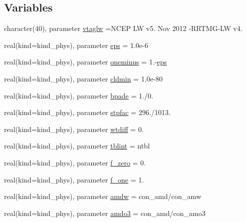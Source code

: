 \subsection*{Variables}
\begin{DoxyCompactItemize}
\item 
character(40), parameter \hyperlink{namespacemodule__radlw__main_a8d63a28d2550f8e193619e46a4c47d70}{vtaglw} =\textquotesingle{}N\+C\+EP LW v5. Nov 2012 -\/R\+R\+T\+MG-\/LW v4. \textquotesingle{}
\item 
real(kind=kind\+\_\+phys), parameter \hyperlink{group__module__radlw__main_gac82309fd8d0e351ac37b276833a10376}{eps} = 1.\+0e-\/6
\item 
real(kind=kind\+\_\+phys), parameter \hyperlink{group__module__radlw__main_ga8c35a92c2a08663ce04bdf9de8717247}{oneminus} = 1.-\/\hyperlink{group__module__radlw__main_gac82309fd8d0e351ac37b276833a10376}{eps}
\item 
real(kind=kind\+\_\+phys), parameter \hyperlink{group__module__radlw__main_gac55ad4a1ff397794e054be6647bafb73}{cldmin} = 1.\+0e-\/80
\item 
real(kind=kind\+\_\+phys), parameter \hyperlink{group__module__radlw__main_ga5c63b9836ad5735dd3d0811ff527c41c}{bpade} = 1./0.
\item 
real(kind=kind\+\_\+phys), parameter \hyperlink{group__module__radlw__main_ga483b88df2bdada7ef349d9530f91b762}{stpfac} = 296./1013.
\item 
real(kind=kind\+\_\+phys), parameter \hyperlink{group__module__radlw__main_gaf1a0ca36bfce779493a7d1a4b81f6f73}{wtdiff} = 0.
\item 
real(kind=kind\+\_\+phys), parameter \hyperlink{group__module__radlw__main_gaf6b84954042db7b1e2a6abdb4d401ccf}{tblint} = ntbl
\item 
real(kind=kind\+\_\+phys), parameter \hyperlink{group__module__radlw__main_ga9b8f65236249b31c8f9fcf1cfd0e7baa}{f\+\_\+zero} = 0.
\item 
real(kind=kind\+\_\+phys), parameter \hyperlink{group__module__radlw__main_ga518605a1451822f1888c6c7e85e07328}{f\+\_\+one} = 1.
\item 
real(kind=kind\+\_\+phys), parameter \hyperlink{group__module__radlw__main_ga9845c3a6eaa014e6a310fe1436162e37}{amdw} = con\+\_\+amd/con\+\_\+amw
\item 
real(kind=kind\+\_\+phys), parameter \hyperlink{group__module__radlw__main_ga06f62c34722a3d7dcec9b5643d78f039}{amdo3} = con\+\_\+amd/con\+\_\+amo3
\item 

\end{DoxyCompactItemize}
